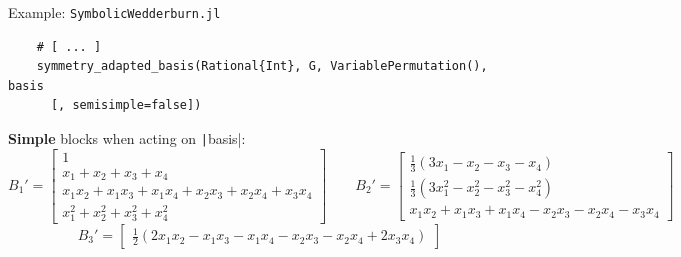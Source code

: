 \documentclass[9pt]{beamer}
\theoremstyle{definition}
\newcommand{\comment}[1]{{\footnotesize \color{black!50}{#1}}}
\begin{document}
  \begin{frame}[fragile]{Example: {\texttt{SymbolicWedderburn.jl}}}
  \vspace*{0.2in}
  \scriptsize

  \begin{verbatim}
    # [ ... ]
    symmetry_adapted_basis(Rational{Int}, G, VariablePermutation(), basis
      [, semisimple=false])
  \end{verbatim}
  \normalsize
  \textbf{Simple} blocks when acting on \texttt|basis|:
  \tiny
  \[
    B_1' = \begin{bmatrix}
            1\\
            x_1 + x_2 + x_3 + x_4\\
            x_{1}x_{2} + x_{1}x_{3} + x_{1}x_{4} + x_{2}x_{3} + x_{2}x_{4} + x_{3}x_{4}\\
            x_{1}^{2} + x_{2}^{2} + x_{3}^{2} + x_{4}^{2}
          \end{bmatrix}
    \qquad
    B_2' = \begin{bmatrix}
          \frac{1}{3}(3x_{1} - x_{2} - x_{3} - x_{4})\\
          \frac{1}{3}(3x_{1}^{2} - x_{2}^{2} - x_{3}^{2} - x_{4}^{2})\\
          x_{1}x_{2} + x_{1}x_{3} + x_{1}x_{4} - x_{2}x_{3} - x_{2}x_{4} - x_{3}x_{4}
          \end{bmatrix}
  \]
  \[
    B_3' = \begin{bmatrix}
          \frac{1}{2}(2x_{1}x_{2} - x_{1}x_{3} - x_{1}x_{4} - x_{2}x_{3} - x_{2}x_{4} + 2x_{3}x_{4})
          \end{bmatrix}
  \]

  \comment{Reduction: $15\times 15 \to (4\times 4, 9\times 9, 2\times 2) \to (4\times 4, 3\times 3, 1\times 1)$-psd constraints.}\\[0.1in]

  \end{frame}
\end{document}
